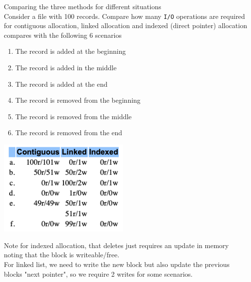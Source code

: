 \documentclass[journal, letterpaper]{IEEEtran}
\begin{document}
\begin{example}{Comparing the three methods for different situations} \\
    Consider a file with 100 records. Compare how many \verb|I/O| operations are required for contiguous allocation, linked allocation and indexed (direct pointer) allocation compares with the following 6 scenarios
    \begin{enumerate}
        \item The record is added at the beginning
        \item The record is added in the middle
        \item The record is added at the end
        \item The record is removed from the beginning
        \item The record is removed from the middle
        \item The record is removed from the end
    \end{enumerate}
    \begin{center}
        \includegraphics[width=6.5cm]{./photos/alloc_comp.png}
    \end{center}
    Note for indexed allocation, that deletes just requires an update in memory noting that the block is writeable/free.
    \newline \\ 
    For linked list, we need to write the new block but also update the previous blocks "next pointer", so we require 2 writes for some scenarios.
\end{example}
\end{document}
